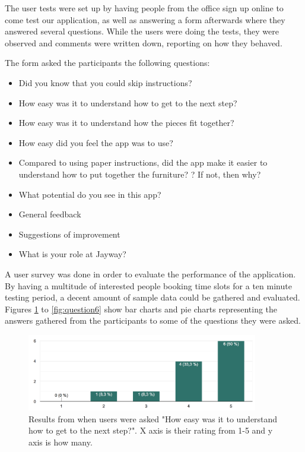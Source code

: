The user tests were set up by having people from the office sign up online to come test our 
application, as well as answering a form afterwards where they answered several 
questions. While the users were doing the tests, they were observed and comments were 
written down, reporting on how they behaved. 

The form asked the participants the following questions:
\begin{itemize}
\item Did you know that you could skip instructions?
\item How easy was it to understand how to get to the next step?
\item How easy was it to understand how the pieces fit together?
\item How easy did you feel the app was to use?
\item Compared to using paper instructions, did the app make it easier to understand how to put together the furniture? ? If not, then why?
\item What potential do you see in this app?
\item General feedback
\item Suggestions of improvement
\item What is your role at Jayway?
\end{itemize}

A user survey was done in order to evaluate the performance of the application. By having a multitude of interested people booking time slots for a ten minute testing period, a decent amount of sample data could be gathered and evaluated. Figures \ref{fig:question1} to \ref{fig:question6} show bar charts and pie charts representing the answers gathered from the participants to some of the questions they were asked. 

\begin{figure}[hbtp]
\begin{center}
\includegraphics[width = 0.9\textwidth]{./Images/easyToGetToNext.png}
\caption{Results from when users were asked "How easy was it to understand how to get to the next step?". X axis is their rating from 1-5 and y axis is how many.}
\label{fig:question1}
\end{center}
\end{figure}

